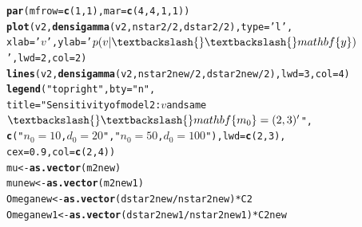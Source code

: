 \documentclass[12pt]{article}\usepackage[]{graphicx}\usepackage[]{color}
\makeatletter
\newcommand{\hlnum}[1]{\textcolor[rgb]{0.686,0.059,0.569}{#1}}%
\newcommand{\hlstr}[1]{\textcolor[rgb]{0.192,0.494,0.8}{#1}}%
\newcommand{\hlopt}[1]{\textcolor[rgb]{0,0,0}{#1}}%
\newcommand{\hlstd}[1]{\textcolor[rgb]{0.345,0.345,0.345}{#1}}%
\newcommand{\hlkwb}[1]{\textcolor[rgb]{0.69,0.353,0.396}{#1}}%
\newcommand{\hlkwc}[1]{\textcolor[rgb]{0.333,0.667,0.333}{#1}}%
\newcommand{\hlkwd}[1]{\textcolor[rgb]{0.737,0.353,0.396}{\textbf{#1}}}%
\newenvironment{kframe}{%
 \def\at@end@of@kframe{}%
 \ifinner\ifhmode%
  \def\at@end@of@kframe{\end{minipage}}%
  \begin{minipage}{\columnwidth}%
 \fi\fi%
 \def\FrameCommand##1{\hskip\@totalleftmargin \hskip-\fboxsep
 \colorbox{shadecolor}{##1}\hskip-\fboxsep
     \hskip-\linewidth \hskip-\@totalleftmargin \hskip\columnwidth}%
 \MakeFramed {\advance\hsize-\width
   \@totalleftmargin\z@ \linewidth\hsize
   \@setminipage}}%
 {\par\unskip\endMakeFramed%
 \at@end@of@kframe}
\newenvironment{knitrout}{}{} %
\makeatother
\begin{document}
\begin{knitrout}
\begin{kframe}
\begin{alltt}
\hlkwd{par}\hlstd{(}\hlkwc{mfrow} \hlstd{=} \hlkwd{c}\hlstd{(}\hlnum{1}\hlstd{,} \hlnum{1}\hlstd{),} \hlkwc{mar} \hlstd{=} \hlkwd{c}\hlstd{(}\hlnum{4}\hlstd{,} \hlnum{4}\hlstd{,} \hlnum{1}\hlstd{,} \hlnum{1}\hlstd{))}
\hlkwd{plot}\hlstd{(v2,} \hlkwd{densigamma}\hlstd{(v2, nstar2} \hlopt{/} \hlnum{2}\hlstd{, dstar2} \hlopt{/} \hlnum{2}\hlstd{),} \hlkwc{type} \hlstd{=} \hlstr{'l'}\hlstd{,}
     \hlkwc{xlab} \hlstd{=} \hlstr{'$v$'}\hlstd{,} \hlkwc{ylab} \hlstd{=} \hlstr{'$p(v|\textbackslash{}\textbackslash{}mathbf\{y\})$'}\hlstd{,} \hlkwc{lwd} \hlstd{=} \hlnum{2}\hlstd{,} \hlkwc{col} \hlstd{=} \hlnum{2}\hlstd{)}
\hlkwd{lines}\hlstd{(v2,} \hlkwd{densigamma}\hlstd{(v2, nstar2new}\hlopt{/}\hlnum{2}\hlstd{, dstar2new}\hlopt{/}\hlnum{2}\hlstd{),} \hlkwc{lwd} \hlstd{=} \hlnum{3}\hlstd{,} \hlkwc{col} \hlstd{=} \hlnum{4}\hlstd{)}
\hlkwd{legend}\hlstd{(}\hlstr{"topright"}\hlstd{,} \hlkwc{bty} \hlstd{=} \hlstr{"n"}\hlstd{,}
       \hlkwc{title} \hlstd{=} \hlstr{"Sensitivity of model 2: $v$ and same $\textbackslash{}\textbackslash{}mathbf\{m_0\} = (2, 3)'$"}\hlstd{,}
       \hlkwd{c}\hlstd{(}\hlstr{"$n_0 = 10$, $d_0 = 20$"}\hlstd{,} \hlstr{"$n_0 = 50$, $d_0 = 100$"}\hlstd{),} \hlkwc{lwd} \hlstd{=} \hlkwd{c}\hlstd{(}\hlnum{2}\hlstd{,} \hlnum{3}\hlstd{),}
       \hlkwc{cex} \hlstd{=} \hlnum{0.9}\hlstd{,} \hlkwc{col} \hlstd{=} \hlkwd{c}\hlstd{(}\hlnum{2}\hlstd{,} \hlnum{4}\hlstd{))}
\hlstd{mu} \hlkwb{<-} \hlkwd{as.vector}\hlstd{(m2new)}
\hlstd{munew} \hlkwb{<-} \hlkwd{as.vector}\hlstd{(m2new1)}
\hlstd{Omeganew} \hlkwb{<-} \hlkwd{as.vector}\hlstd{(dstar2new} \hlopt{/} \hlstd{nstar2new)} \hlopt{*} \hlstd{C2}
\hlstd{Omeganew1} \hlkwb{<-} \hlkwd{as.vector}\hlstd{(dstar2new1} \hlopt{/} \hlstd{nstar2new1)} \hlopt{*} \hlstd{C2new}


\end{alltt}
\end{kframe}
\end{knitrout}
\end{document}
